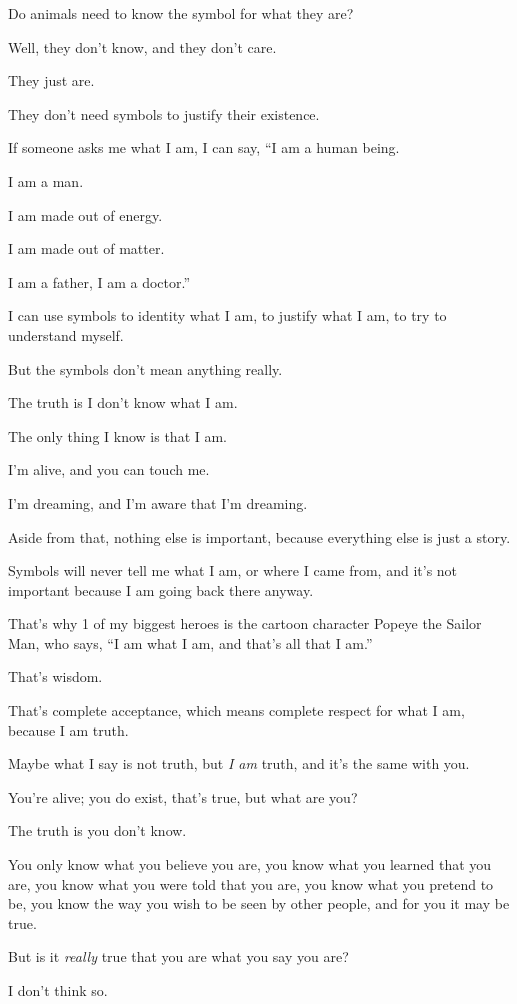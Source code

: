 \documentclass{article}
\numberwithin{equation}{section}
\begin{document}
Do animals need to know the symbol for what they are?

Well, they don't know, and they don't care.

They just are.

They don't need symbols to justify their existence.

%
If someone asks me what I am, I can say, ``I am a human being.

I am a man.

I am made out of energy.

I am made out of matter.

I am a father, I am a doctor.''

I can use symbols to identity what I am, to justify what I am, to try to understand myself.

But the symbols don't mean anything really.

The truth is I don't know what I am.

The only thing I know is that I am.

I'm alive, and you can touch me.

I'm dreaming, and I'm aware that I'm dreaming.

Aside from that, nothing else is important, because everything else is just a story.

Symbols will never tell me what I am, or where I came from, and it's not important because I am going back there anyway.

That's why 1 of my biggest heroes is the cartoon character Popeye the Sailor Man, who says, ``I am what I am, and that's all that I am.''

That's wisdom.

That's complete acceptance, which means complete respect for what I am, because I am truth.

Maybe what I say is not truth, but \textit{I am} truth, and it's the same with you.

%
You're alive; you do exist, that's true, but what are you?

The truth is you don't know.

You only know what you believe you are, you know what you learned that you are, you know what you were told that you are, you know what you pretend to be, you know the way you wish to be seen by other people, and for you it may be true.

But is it \textit{really} true that you are what you say you are?

I don't think so.
\end{document}
